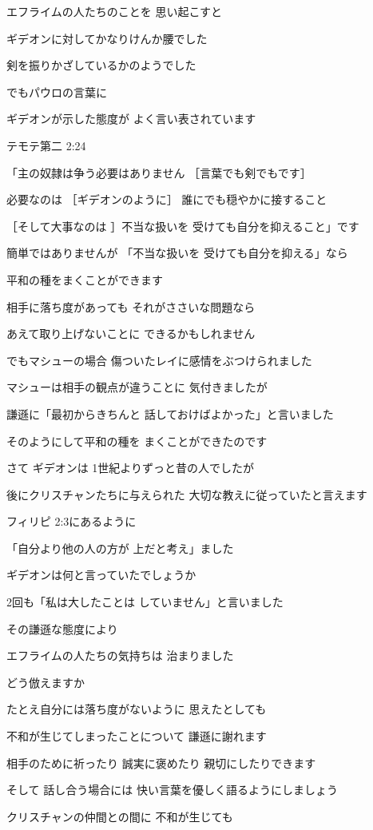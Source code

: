 \documentclass[twocolumn]{jsarticle}
\begin{document}
エフライムの人たちのことを
思い起こすと

ギデオンに対してかなりけんか腰でした

剣を振りかざしているかのようでした

でもパウロの言葉に

ギデオンが示した態度が
よく言い表されています

テモテ第二 2:24

「主の奴隷は争う必要はありません
［言葉でも剣でもです］

必要なのは ［ギデオンのように］
誰にでも穏やかに接すること

［そして大事なのは ］不当な扱いを
受けても自分を抑えること」です

簡単ではありませんが 「不当な扱いを
受けても自分を抑える」なら

平和の種をまくことができます

相手に落ち度があっても
それがささいな問題なら

あえて取り上げないことに
できるかもしれません

でもマシューの場合
傷ついたレイに感情をぶつけられました

マシューは相手の観点が違うことに
気付きましたが

謙遜に「最初からきちんと
話しておけばよかった」と言いました

そのようにして平和の種を
まくことができたのです

さて ギデオンは
1世紀よりずっと昔の人でしたが

後にクリスチャンたちに与えられた
大切な教えに従っていたと言えます

フィリピ 2:3にあるように

「自分より他の人の方が
上だと考え」ました

ギデオンは何と言っていたでしょうか

2回も「私は大したことは
していません」と言いました

その謙遜な態度により

エフライムの人たちの気持ちは
治まりました

どう倣えますか

たとえ自分には落ち度がないように
思えたとしても

不和が生じてしまったことについて
謙遜に謝れます

相手のために祈ったり
誠実に褒めたり 親切にしたりできます

そして 話し合う場合には
快い言葉を優しく語るようにしましょう

クリスチャンの仲間との間に
不和が生じても
\end{document}
